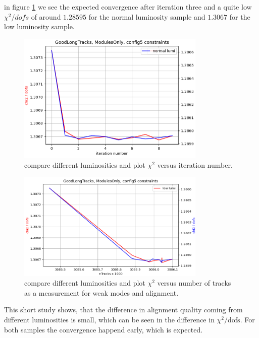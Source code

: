 in figure \ref{fig:chi2iter_lumi_normal} we see the expected convergence after iteration three and a quite low $\chi^2 / dofs$ of around $\num{1.28595}$ for the normal luminosity sample
and $\num{1.3067}$ for the low luminosity sample.

\begin{figure}
  \centering
  \includegraphics[width=0.8\textwidth]{plots/renewed_plots/modules_chi2_c5.png}
  \caption{compare different luminosities and plot $\chi^2$ versus iteration number.}
  \label{fig:chi2iter_lumi_normal}
\end{figure}

\begin{figure}
  \centering
  \includegraphics[width=0.8\textwidth]{plots/jan_17_2022/chi2_tracks_modulesOnly.png}
  \caption{compare different luminosities and plot $\chi^2$ versus number of tracks as a measurement for weak modes and alignment.}
  \label{fig:chi2tracks_lumi_normal}
\end{figure}

This short study shows, that the difference in alignment quality coming from different luminosities is small, which can be seen in the difference in $\chi^2 / \text{dofs}$. For both samples the convergence happend early, which is expected.

